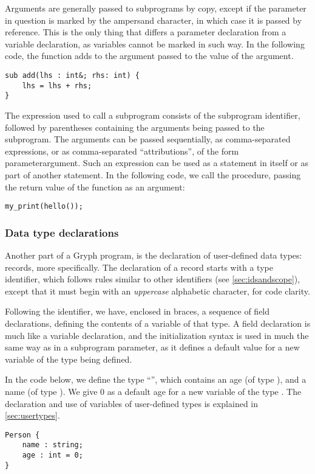 Arguments are generally passed to subprograms by copy, except if the parameter in question is marked by the ampersand character, in which case it is passed by reference. This is the only thing that differs a parameter declaration from a variable declaration, as variables cannot be marked in such way. In the following code, the function  adds to the argument passed to  the value of the  argument.
\begin{lstlisting}[language=Gryph]
sub add(lhs : int&; rhs: int) {
	lhs = lhs + rhs;
}
\end{lstlisting}

The expression used to call a subprogram consists of the subprogram identifier, followed by parentheses containing the arguments being passed to the subprogram. The arguments can be passed sequentially, as comma-separated expressions, or as comma-separated ``attributions'', of the form parameter\key{=}argument.
Such an expression can be used as a statement in itself or as part of another statement. In the following code, we call the  procedure, passing the return value of the  function as an argument:
\begin{lstlisting}[language=Gryph]
my_print(hello());
\end{lstlisting}

\subsubsection{Data type declarations}
\label{sec:typedecl}
Another part of a Gryph program, is the declaration of user-defined data types: records, more specifically. The declaration of a record starts with a type identifier, which follows rules similar to other identifiers (see \autoref{sec:idsandscope}), except that it must begin with an \emph{uppercase} alphabetic character, for code clarity. 

Following the identifier, we have, enclosed in braces, a sequence of field declarations, defining the contents of a variable of that type. A field declaration is much like a variable declaration, and the initialization syntax is used in much the same way as in a subprogram parameter, as it defines a default value for a new variable of the type being defined.

In the code below, we define the type ``'', which contains an age (of type ), and a name (of type ). We give 0 as a default age for a new variable of the type . The declaration and use of variables of user-defined types is explained in \autoref{sec:usertypes}.
\begin{lstlisting}[language=Gryph]
Person {
	name : string;
	age : int = 0;
}
\end{lstlisting}

